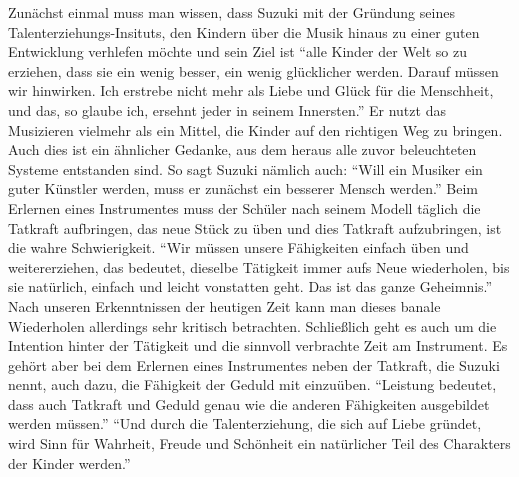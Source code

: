 Zunächst einmal muss man wissen, dass Suzuki mit der Gründung seines
Talenterziehungs-Insituts, den Kindern über die Musik hinaus zu einer guten
Entwicklung verhlefen möchte und sein Ziel ist \enquote{alle Kinder der Welt so
zu erziehen, dass sie ein wenig besser, ein wenig glücklicher werden. Darauf
müssen wir hinwirken. Ich erstrebe nicht mehr als Liebe und Glück für die
Menschheit, und das, so glaube ich, ersehnt jeder in seinem Innersten.}
\autocite[103]{suzuki:erziehung_ist_liebe}
Er nutzt das Musizieren vielmehr als ein Mittel, die Kinder auf den richtigen
Weg zu bringen. Auch dies ist ein ähnlicher Gedanke, aus dem heraus alle zuvor
beleuchteten Systeme entstanden sind. So sagt Suzuki nämlich auch: \enquote{Will
ein Musiker ein guter Künstler werden, muss er zunächst ein besserer Mensch
werden.}\autocite[103]{suzuki:erziehung_ist_liebe} Beim Erlernen eines
Instrumentes muss der Schüler nach seinem Modell täglich die Tatkraft
aufbringen, das neue Stück zu üben und dies Tatkraft aufzubringen, ist die wahre
Schwierigkeit. %
\enquote{Wir müssen unsere Fähigkeiten einfach üben und weitererziehen, das
bedeutet, dieselbe Tätigkeit immer aufs Neue wiederholen, bis sie natürlich,
einfach und leicht vonstatten geht. Das ist das ganze
Geheimnis.}\autocite[57]{suzuki:erziehung_ist_liebe} Nach unseren Erkenntnissen
der heutigen Zeit kann man dieses banale Wiederholen allerdings sehr kritisch
betrachten. Schließlich geht es auch um die Intention hinter der Tätigkeit und
die sinnvoll verbrachte Zeit am Instrument. Es gehört aber bei dem Erlernen
eines Instrumentes neben der Tatkraft, die Suzuki nennt, auch dazu, die
Fähigkeit der Geduld mit einzuüben. \enquote{Leistung bedeutet, dass auch
Tatkraft und Geduld genau wie die anderen Fähigkeiten ausgebildet werden
müssen.}
\autocite[60]{suzuki:erziehung_ist_liebe}
\enquote{Und durch die Talenterziehung, die sich auf Liebe gründet, wird Sinn
für Wahrheit, Freude und Schönheit ein natürlicher Teil des Charakters der
Kinder werden.} \autocite[75]{suzuki:erziehung_ist_liebe}

